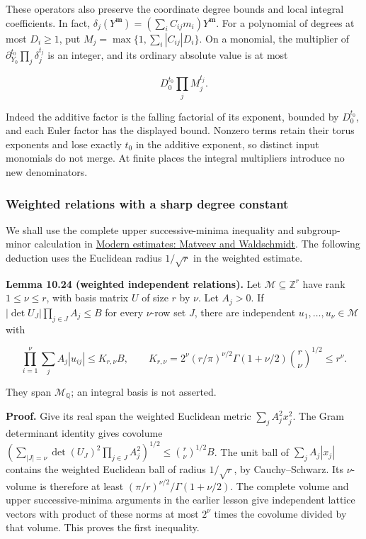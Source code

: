 \documentclass[
  11pt,
  a4paper,
]{article}
\begin{document}
These operators also preserve the coordinate degree bounds and local
integral coefficients. In fact,
\(\delta_j(Y^{\boldsymbol m})=(\sum_iC_{ij}m_i)Y^{\boldsymbol m}\). For
a polynomial of degrees at most \(D_i\ge1\), put
\(M_j=\max\{1,\sum_i|C_{ij}|D_i\}\). On a monomial, the multiplier of
\(\partial_{Y_0}^{t_0}\prod_j\delta_j^{t_j}\) is an integer, and its
ordinary absolute value is at most

\[
D_0^{t_0}\prod_jM_j^{t_j}.
\tag{10.65}
\]

Indeed the additive factor is the falling factorial of its exponent,
bounded by \(D_0^{t_0}\), and each Euler factor has the displayed bound.
Nonzero terms retain their torus exponents and lose exactly \(t_0\) in
the additive exponent, so distinct input monomials do not merge. At
finite places the integral multipliers introduce no new denominators.

\subsubsection{Weighted relations with a sharp degree
constant}\label{weighted-relations-with-a-sharp-degree-constant}

We shall use the complete upper successive-minima inequality and
subgroup-minor calculation in
\href{../TR-BAKER-08.html\#the-subgroup-polynomial-and-its-integer-minors}{Modern
estimates: Matveev and Waldschmidt}. The following deduction uses the
Euclidean radius \(1/\sqrt r\) in the weighted estimate.

\textbf{Lemma 10.24 (weighted independent relations).} Let
\(\mathcal M\subseteq\mathbb Z^r\) have rank \(1\le\nu\le r\), with
basis matrix \(U\) of size \(r\) by \(\nu\). Let \(A_j>0\). If
\(|\det U_J|\prod_{j\in J}A_j\le B\) for every \(\nu\)-row set \(J\),
there are independent \(u_1,\ldots,u_\nu\in\mathcal M\) with

\[
\prod_{i=1}^{\nu}\sum_jA_j|u_{ij}|
\le K_{r,\nu}B,\qquad
K_{r,\nu}=2^\nu(r/\pi)^{\nu/2}
\Gamma(1+\nu/2)\binom r\nu^{1/2}\le r^\nu.
\tag{10.66}
\]

They span \(\mathcal M_{\mathbb Q}\); an integral basis is not asserted.

\textbf{Proof.} Give its real span the weighted Euclidean metric
\(\sum_jA_j^2x_j^2\). The Gram determinant identity gives covolume
\((\sum_{|J|=\nu}\det(U_J)^2\prod_{j\in J}A_j^2)^{1/2}\le\binom r\nu^{1/2}B\).
The unit ball of \(\sum_jA_j|x_j|\) contains the weighted Euclidean ball
of radius \(1/\sqrt r\), by Cauchy--Schwarz. Its \(\nu\)-volume is
therefore at least \((\pi/r)^{\nu/2}/\Gamma(1+\nu/2)\). The complete
volume and upper successive-minima arguments in the earlier lesson give
independent lattice vectors with product of these norms at most
\(2^\nu\) times the covolume divided by that volume. This proves the
first inequality.
\end{document}
